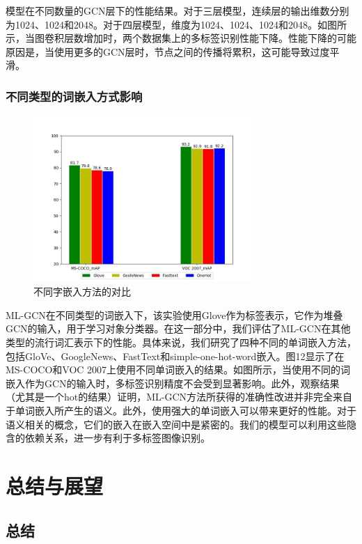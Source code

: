 模型在不同数量的GCN层下的性能结果。对于三层模型，连续层的输出维数分别为1024、1024和2048。对于四层模型，维度为1024、1024、1024和2048。如图所示，当图卷积层数增加时，两个数据集上的多标签识别性能下降。性能下降的可能原因是，当使用更多的GCN层时，节点之间的传播将累积，这可能导致过度平滑。

\subsection{不同类型的词嵌入方式影响}
\begin{figure}[htbp!]
	\centering
	\includegraphics[width=0.75\textwidth]{figures/p4-6.jpg}
	\caption{不同字嵌入方法的对比}\label{fig:simuP1P2Result}
	\vspace{-1em}
\end{figure}
ML-GCN在不同类型的词嵌入下，该实验使用Glove\cite{Xue2011Correlative}作为标签表示，它作为堆叠GCN的输入，用于学习对象分类器。在这一部分中，我们评估了ML-GCN在其他类型的流行词汇表示下的性能。具体来说，我们研究了四种不同的单词嵌入方法，包括GloVe\cite{Xue2011Correlative}、GoogleNews\cite{Guo2011Multi}、FastText和simple-one-hot-word嵌入。图12显示了在MS-COCO和VOC 2007上使用不同单词嵌入的结果。如图所示，当使用不同的词嵌入作为GCN的输入时，多标签识别精度不会受到显著影响。此外，观察结果（尤其是一个hot的结果）证明，ML-GCN方法所获得的准确性改进并非完全来自于单词嵌入所产生的语义。此外，使用强大的单词嵌入可以带来更好的性能。对于语义相关的概念，它们的嵌入在嵌入空间中是紧密的。我们的模型可以利用这些隐含的依赖关系，进一步有利于多标签图像识别。



\chapter{总结与展望}

\section{总结}

